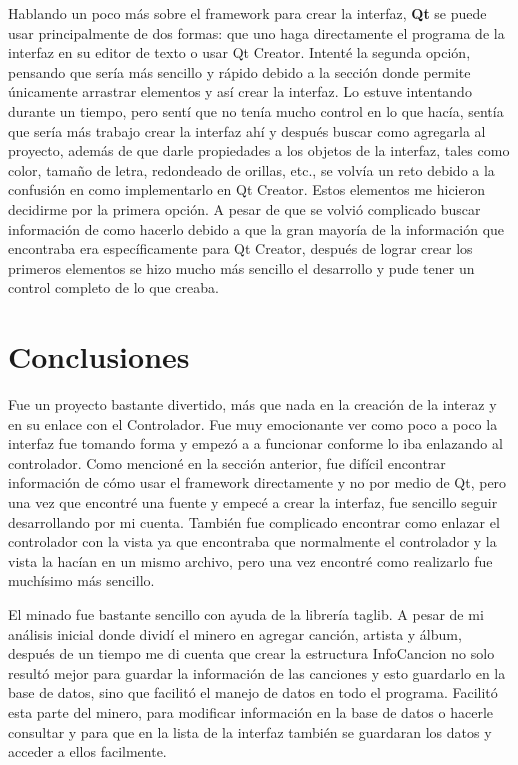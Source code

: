 \documentclass{article}
\begin{document}
Hablando un poco más sobre el framework para crear la interfaz, \textbf{Qt} se puede usar principalmente de dos formas: que uno haga directamente el programa de la interfaz en su editor de texto o usar Qt Creator. Intenté la segunda opción, pensando que sería más sencillo y rápido debido a la sección donde permite únicamente arrastrar elementos y así crear la interfaz. Lo estuve intentando durante un tiempo, pero sentí que no tenía mucho control en lo que hacía, sentía que sería más trabajo crear la interfaz ahí y después buscar como agregarla al proyecto, además de que darle propiedades a los objetos de la interfaz, tales como color, tamaño de letra, redondeado de orillas, etc., se volvía un reto debido a la confusión en como implementarlo en Qt Creator. Estos elementos me hicieron decidirme por la primera opción. A pesar de que se volvió complicado buscar información de como hacerlo debido a que la gran mayoría de la información que encontraba era específicamente para Qt Creator, después de lograr crear los primeros elementos se hizo mucho más sencillo el desarrollo y pude tener un control completo de lo que creaba. 

\section{Conclusiones}

Fue un proyecto bastante divertido, más que nada en la creación de la interaz y en su enlace con el Controlador. Fue muy emocionante ver como poco a poco la interfaz fue tomando forma y empezó a a funcionar conforme lo iba enlazando al controlador. Como mencioné en la sección anterior, fue difícil encontrar información de cómo usar el framework directamente y no por medio de Qt, pero una vez que encontré una fuente y empecé a crear la interfaz, fue sencillo seguir desarrollando por mi cuenta. También fue complicado encontrar como enlazar el controlador con la vista ya que encontraba que normalmente el controlador y la vista la hacían en un mismo archivo, pero una vez encontré como realizarlo fue muchísimo más sencillo.

El minado fue bastante sencillo con ayuda de la librería taglib. A pesar de mi análisis inicial donde dividí el minero en agregar canción, artista y álbum, después de un tiempo me di cuenta que crear la estructura InfoCancion no solo resultó mejor para guardar la información de las canciones y esto guardarlo en la base de datos, sino que facilitó el manejo de datos en todo el programa. Facilitó esta parte del minero, para modificar información en la base de datos o hacerle consultar y para que en la lista de la interfaz también se guardaran los datos y acceder a ellos facilmente.
\end{document}
